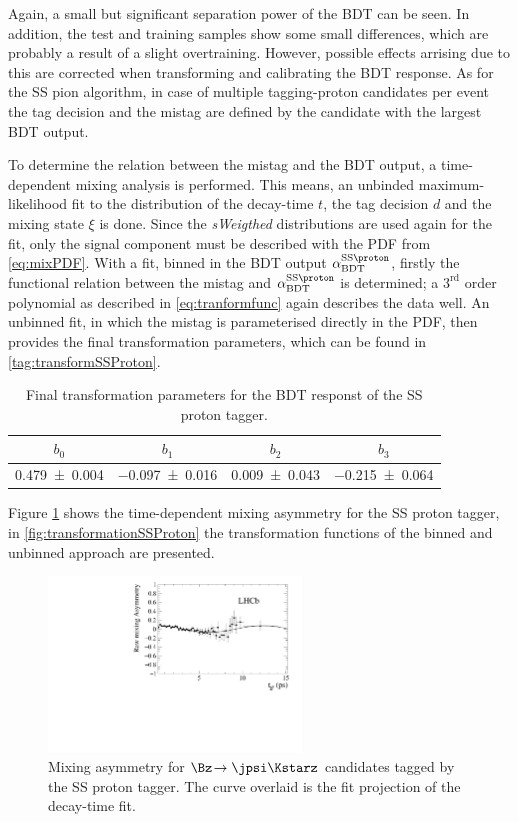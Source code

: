 Again, a small but significant separation power of the BDT can be seen.
In addition, the test and training samples show some small differences, which are probably a result of a slight overtraining.
However, possible effects arrising due to this are corrected when transforming and calibrating the BDT response.
As for the SS pion algorithm, in case of multiple tagging-proton candidates per event the tag decision and the mistag are defined by the candidate with the largest BDT output.

To determine the relation between the mistag and the BDT output, a time-dependent mixing analysis is performed.
This means, an unbinded maximum-likelihood fit to the distribution of the decay-time $t$, the tag decision $d$ and the mixing state $\xi$ is done.
Since the \emph{sWeigthed} distributions are used again for the fit, only the signal component must be described with the PDF from \cref{eq:mixPDF}.
With a fit, binned in the BDT output $\alpha^{\text{SS}\proton}_\text{BDT}$, firstly the functional relation between the mistag and $\alpha^{\text{SS}\proton}_\text{BDT}$ is determined; a $3^{\text{rd}}$ order polynomial as described in \cref{eq:tranformfunc} again describes the data well.
An unbinned fit, in which the mistag is parameterised directly in the PDF, then provides the final transformation parameters, which can be found in \cref{tag:transformSSProton}.
\begin{table}[tbp]
	\centering
	\caption{Final transformation parameters for the BDT responst of the SS proton tagger.}
	\begin{tabular}{cccc}
		\toprule
		$b_0$ & $b_1$ & $b_2$ & $b_3$ \\
		\midrule
		\num{0.479\pm0.004} & \num{-0.097\pm0.016} & \num{0.009\pm0.043} & \num{-0.215\pm0.064} \\
		\bottomrule
	\end{tabular}
	\label{tab:transformSSProton}
\end{table}
Figure \ref{fig:MixasymmetrieSSProton} shows the time-dependent mixing asymmetry for the SS proton tagger, in \cref{fig:transformationSSProton} the transformation functions of the binned and unbinned approach are presented.
\begin{figure}[tbp]
	\begin{center}
		\includegraphics[width=0.6\textwidth]{08FlavourTagging/figs/Asymmetry_SSProton.pdf}
	\end{center}
	\caption{Mixing asymmetry for $\Bz\!\to\jpsi\Kstarz$ candidates tagged by the SS proton tagger.
	The curve overlaid is the fit projection of the decay-time fit.}
	\label{fig:MixasymmetrieSSProton}
\end{figure}
